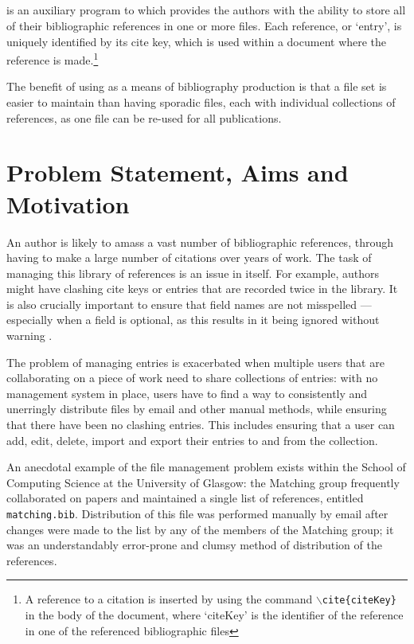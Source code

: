 \subsection{\bibtex}
\bibtex{} is an auxiliary program to \latex which provides the authors with the ability to store all of their bibliographic references in one or more files.  Each reference, or `entry', is uniquely identified by its cite key, which is used within a document where the reference is made.\footnote{A reference to a citation is inserted by using the \latex command \texttt{$\backslash$cite\{citeKey\}} in the body of the document, where `citeKey' is the identifier of the reference in one of the referenced bibliographic files}

The benefit of using \bibtex{} as a means of bibliography production is that a file set is easier to maintain than having sporadic files, each with individual collections of references, as one file can be re-used for all publications.

\section{Problem Statement, Aims and Motivation}
An author is likely to amass a vast number of bibliographic references, through having to make a large number of citations over years of work.  The task of managing this library of references is an issue in itself.  For example, authors might have clashing cite keys or entries that are recorded twice in the library.  It is also crucially important to ensure that field names are not misspelled --- especially when a field is optional, as this results in it being ignored without warning \cite{OP88}.

The problem of managing entries is exacerbated when multiple users that are collaborating on a piece of work need to share collections of entries: with no management system in place, users have to find a way to consistently and unerringly distribute files by email and other manual methods, while ensuring that there have been no clashing entries.  This includes ensuring that a user can add, edit, delete, import and export their entries to and from the collection.

An anecdotal example of the \bibtex{} file management problem exists within the School of Computing Science at the University of Glasgow: the Matching group frequently collaborated on papers and maintained a single list of references, entitled \texttt{matching.bib}.  Distribution of this file was performed manually by email after changes were made to the list by any of the members of the Matching group; it was an understandably error-prone and clumsy method of distribution of the references.

